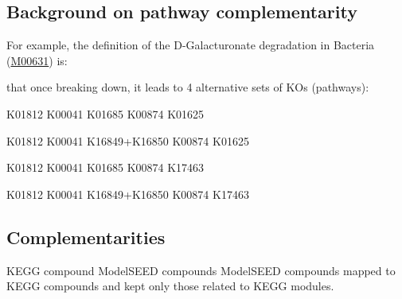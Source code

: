 \documentclass[sn-mathphys,Numbered, lineno]{sn-jnl}  %
\theoremstyle{thmstyleone}%
\theoremstyle{thmstyletwo}%
\theoremstyle{thmstylethree}%
\begin{document}
\begin{appendices}
        \subsection{Background on pathway complementarity}

            For example, the definition of the D-Galacturonate degradation in Bacteria (\href{https://www.genome.jp/dbget-bin/www_bget?M00631}{M00631}) is: \vspace{0.35cm}


            
            \begin{flushleft}
                that once breaking down, it leads to 4 alternative sets of KOs (pathways):\vspace{0.25cm}
            \end{flushleft} 

            K01812 K00041 K01685 K00874 K01625\vspace{0.25cm}

            K01812 K00041 K16849+K16850 K00874 K01625\vspace{0.25cm}

            K01812 K00041 K01685 K00874 K17463\vspace{0.25cm}

            K01812 K00041 K16849+K16850 K00874 K17463\vspace{0.5cm}


        \subsection{Complementarities}
            
            KEGG compound 
            ModelSEED compounds
            ModelSEED compounds mapped to KEGG compounds and kept only those related to KEGG modules. 


\end{appendices}



\end{document}

